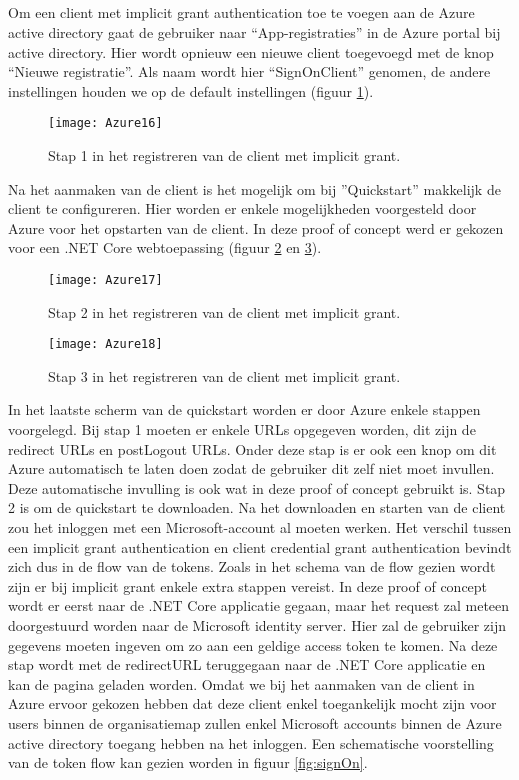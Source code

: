\subsection{}
Om een client met implicit grant authentication toe te voegen aan de Azure active directory gaat de gebruiker naar “App-registraties” in de Azure portal bij active directory. Hier wordt opnieuw een nieuwe client toegevoegd met de knop “Nieuwe registratie”. Als naam wordt hier “SignOnClient” genomen, de andere instellingen houden we op de default instellingen (figuur \ref{fig:azure16}). 
\begin{figure}[H]
	\centering
	\texttt{[image: Azure16]} 
	\caption[Azure16]{Stap 1 in het registreren van de client met implicit grant.}
	\label{fig:azure16}
\end{figure}
Na het aanmaken van de client is het mogelijk om bij ”Quickstart” makkelijk de client te configureren. Hier worden er enkele mogelijkheden voorgesteld door Azure voor het opstarten van de client. In deze proof of concept werd er gekozen voor een .NET Core webtoepassing (figuur \ref{fig:azure17} en \ref{fig:azure18}).
\begin{figure}[H]
	\centering
	\texttt{[image: Azure17]} 
	\caption[Azure17]{Stap 2 in het registreren van de client met implicit grant.}
	\label{fig:azure17}
\end{figure}\newpage
\begin{figure}[H]
	\centering
	\texttt{[image: Azure18]} 
	\caption[Azure18]{Stap 3 in het registreren van de client met implicit grant.}
	\label{fig:azure18}
\end{figure}
In het laatste scherm van de quickstart worden er door Azure enkele stappen voorgelegd. Bij stap 1 moeten er enkele URLs opgegeven worden, dit zijn de redirect URLs en postLogout URLs. Onder deze stap is er ook een knop om dit Azure automatisch te laten doen zodat de gebruiker dit zelf niet moet invullen. Deze automatische invulling is ook wat in deze proof of concept gebruikt is. Stap 2 is om de quickstart te downloaden. Na het downloaden en starten van de client zou het inloggen met een Microsoft-account al moeten werken.\newline\newline
Het verschil tussen een implicit grant authentication en client credential grant authentication bevindt zich dus in de flow van de tokens. Zoals in het schema van de flow gezien wordt zijn er bij implicit grant enkele extra stappen vereist. In deze proof of concept wordt er eerst naar de .NET Core applicatie gegaan, maar het request zal meteen doorgestuurd worden naar de Microsoft identity server. Hier zal de gebruiker zijn gegevens moeten ingeven om zo aan een geldige access token te komen. Na deze stap wordt met de redirectURL teruggegaan naar de .NET Core applicatie en kan de pagina geladen worden. Omdat we bij het aanmaken van de client in Azure ervoor gekozen hebben dat deze client enkel toegankelijk mocht zijn voor users binnen de organisatiemap zullen enkel Microsoft accounts binnen de Azure active directory toegang hebben na het inloggen. Een schematische voorstelling van de token flow kan gezien worden in figuur \ref{fig:signOn}. 
